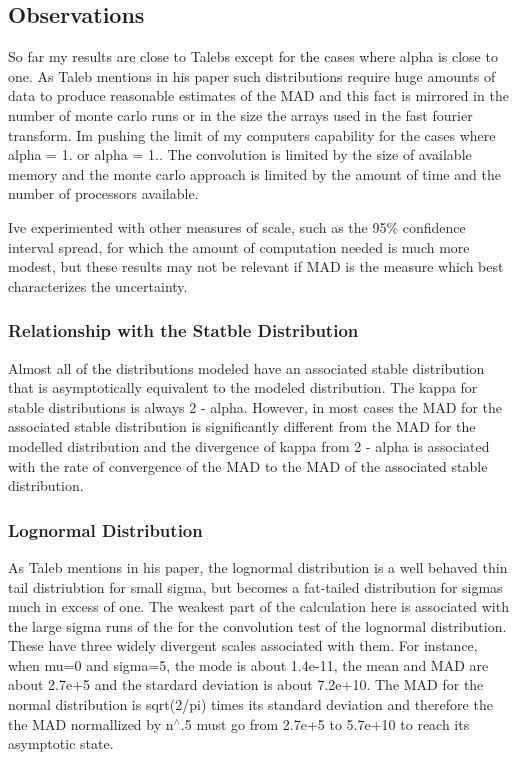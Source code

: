 \subsection*{Observations}

So far my results are close to Taleb\textquotesingle{}s except for the cases where alpha is close to one. As Taleb mentions in his paper such distributions require huge amounts of data to produce reasonable estimates of the M\+AD and this fact is mirrored in the number of monte carlo runs or in the size the arrays used in the fast fourier transform. I\textquotesingle{}m pushing the limit of my computer\textquotesingle{}s capability for the cases where alpha = 1. or alpha = 1.. The convolution is limited by the size of available memory and the monte carlo approach is limited by the amount of time and the number of processors available.

I\textquotesingle{}ve experimented with other measures of scale, such as the 95\% confidence interval spread, for which the amount of computation needed is much more modest, but these results may not be relevant if M\+AD is the measure which best characterizes the uncertainty.

\subsubsection*{Relationship with the Statble Distribution}

Almost all of the distributions modeled have an associated stable distribution that is asymptotically equivalent to the modeled distribution. The kappa for stable distributions is always 2 -\/ alpha. However, in most cases the M\+AD for the associated stable distribution is significantly different from the M\+AD for the modelled distribution and the divergence of kappa from 2 -\/ alpha is associated with the rate of convergence of the M\+AD to the M\+AD of the associated stable distribution.

\subsubsection*{Lognormal Distribution}

As Taleb mentions in his paper, the lognormal distribution is a well behaved thin tail distriubtion for small sigma, but becomes a fat-\/tailed distribution for sigmas much in excess of one. The weakest part of the calculation here is associated with the large sigma runs of the for the convolution test of the lognormal distribution. These have three widely divergent scales associated with them. For instance, when mu=0 and sigma=5, the mode is about 1.\+4e-\/11, the mean and M\+AD are about 2.\+7e+5 and the stardard deviation is about 7.\+2e+10. The M\+AD for the normal distribution is sqrt(2/pi) times it\textquotesingle{}s standard deviation and therefore the the M\+AD normallized by n$^\wedge$.5 must go from 2.\+7e+5 to 5.\+7e+10 to reach it\textquotesingle{}s asymptotic state.


